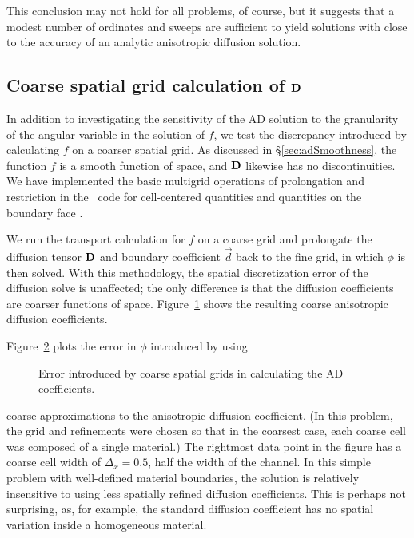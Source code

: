 This conclusion may not hold for all problems, of course, but it suggests that
a modest number of ordinates and sweeps are sufficient to yield solutions with
close to the accuracy of an analytic anisotropic diffusion solution.

\clearpage
\subsection{Coarse spatial grid calculation of \texorpdfstring{$\mathbf{D}$}{D}}
\label{sec:coarseGridAdCoeff}

In addition to investigating the sensitivity of the AD solution to the
granularity of
the angular variable in the solution of $f$, we test the discrepancy
introduced by calculating $f$ on a coarser spatial grid. As discussed in
\S\ref{sec:adSmoothness}, the function $f$ is a smooth function of space, and
$\mathbf{D}$ likewise has no discontinuities. We have implemented the basic
multigrid operations of prolongation and restriction in the \pytrt\ code
for cell-centered quantities and quantities on the boundary face \cite{Pytrt}.

We run the transport calculation for $f$ on a coarse grid and prolongate the
diffusion tensor $\mathbf{D}$ and boundary coefficient $\vec{d}$ back to the fine
grid, in which $\phi$
is then solved. With this methodology, the spatial discretization error of the
diffusion solve is unaffected; the only difference is that the diffusion
coefficients are coarser functions of space. Figure~\ref{fig:ssSingleMgD} shows
the resulting coarse anisotropic diffusion coefficients.

\begin{figure}[htb]
  \centering
{}%
%
  \label{fig:ssSingleMgD}
\end{figure}

Figure~\ref{fig:ssSingleMgConv} plots the error in $\phi$ introduced by using
%
\begin{figure}[htb]
  \centering
  
  \caption{Error introduced by coarse spatial grids in calculating the AD
  coefficients.}
  \label{fig:ssSingleMgConv}
\end{figure}
%
coarse approximations to the anisotropic diffusion coefficient. (In this
problem, the grid and refinements were chosen so that in the coarsest case, each
coarse cell was composed of a single material.) 
The rightmost data point in the figure has a coarse cell width of
$\Delta_x=0.5$, half the width of the channel.
In this simple problem with well-defined material boundaries, the
solution is relatively insensitive to using less spatially refined diffusion
coefficients. This is perhaps not surprising, as, for example, the standard
diffusion coefficient has no spatial variation inside a homogeneous material.

